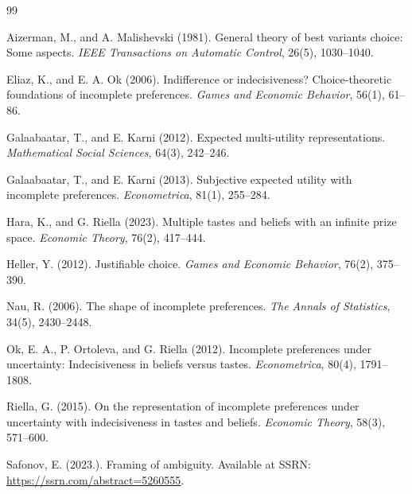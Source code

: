 \documentclass[11pt]{article}
\begin{document}
\singlespacing
\setlength\bibsep{0.8em}
\begin{thebibliography}{99}

Aizerman, M., and A. Malishevski (1981).
General theory of best variants choice: Some aspects.
\textit{IEEE Transactions on Automatic Control}, 26(5), 1030--1040.

Eliaz, K., and E. A. Ok (2006).
Indifference or indecisiveness? Choice-theoretic foundations of incomplete preferences.
\textit{Games and Economic Behavior}, 56(1), 61--86.

Galaabaatar, T., and E. Karni (2012).
Expected multi-utility representations.
\textit{Mathematical Social Sciences}, 64(3), 242--246.

Galaabaatar, T., and E. Karni (2013).
Subjective expected utility with incomplete preferences.
\textit{Econometrica}, 81(1), 255--284.

Hara, K., and G. Riella (2023).
Multiple tastes and beliefs with an infinite prize space.
\textit{Economic Theory}, 76(2), 417--444.

Heller, Y. (2012).
Justifiable choice.
\textit{Games and Economic Behavior}, 76(2), 375--390.

Nau, R. (2006).
The shape of incomplete preferences.
\textit{The Annals of Statistics}, 34(5), 2430--2448.

Ok, E. A., P. Ortoleva, and G. Riella (2012).
Incomplete preferences under uncertainty: Indecisiveness in beliefs versus tastes.
\textit{Econometrica}, 80(4), 1791--1808.

Riella, G. (2015).
On the representation of incomplete preferences under uncertainty with indecisiveness in tastes and beliefs.
\textit{Economic Theory}, 58(3), 571--600.

Safonov, E. (2023.).
Framing of ambiguity.
Available at SSRN: \url{https://ssrn.com/abstract=5260555}.

\end{thebibliography}
\end{document}
